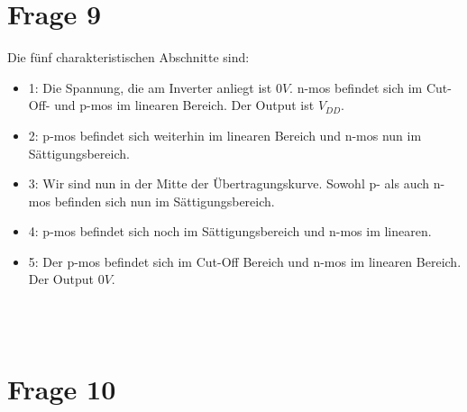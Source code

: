 \documentclass[a4paper]{scrartcl}
\begin{document}
\section*{Frage 9}
Die fünf charakteristischen Abschnitte sind: 
\begin{itemize}
	\item 1: Die Spannung, die am Inverter anliegt ist $0V$. n-mos befindet sich im Cut-Off- und p-mos im linearen Bereich. Der Output ist $V_{DD}$.
	\item 2: p-mos befindet sich weiterhin im linearen Bereich und n-mos nun im Sättigungsbereich.
	\item 3: Wir sind nun in der Mitte der Übertragungskurve. Sowohl p- als auch n-mos befinden sich nun im Sättigungsbereich.
	\item 4: p-mos befindet sich noch im Sättigungsbereich und n-mos im linearen.
	\item 5: Der p-mos befindet sich im Cut-Off Bereich und n-mos im linearen Bereich. Der Output $0V$.
\end{itemize}
~\\
~\\
\section*{Frage 10}

~\\
~\\
\end{document}

